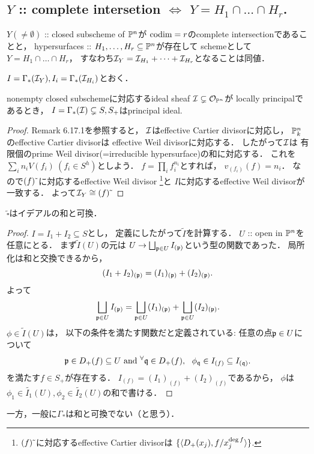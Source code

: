 \documentclass[a4paper]{jsarticle}
\begin{document}
    \subsection{$Y$ :: complete intersetion $\iff$ $Y=H_1\cap\dots\cap H_r$.}
    \begin{Claim}
        $Y (\neq \emptyset)$ :: closed subscheme of $\mathbb{P}^n$が
        $\operatorname{codim}=r$のcomplete intersectionであることと，
        hypersurfaces :: $H_1, \dots, H_r \subseteq \mathbb{P}^n$が存在して
        schemeとして$Y=H_1 \cap\dots\cap H_r$，
        すなわち$\mathcal{I}_Y=\mathcal{I}_{H_1}+\dots+\mathcal{I}_{H_r}$となることは同値．
    \end{Claim}
    $I=\Gamma_*(\mathcal{I}_Y), I_i=\Gamma_*(\mathcal{I}_{H_i})$とおく．

    \begin{Lemma}
        nonempty closed subschemeに対応するideal sheaf
        $\mathcal{I} \subsetneq \mathcal{O}_{\mathbb{P}^n}$が
        locally principalであるとき，
        $I=\Gamma_*(\mathcal{I}) \subsetneq S, S_+$はprincipal ideal.
    \end{Lemma}
    \begin{proof}
        Remark 6.17.1を参照すると，
        $\mathcal{I}$はeffective Cartier divisorに対応し，
        $\mathbb{P}^n_k$のeffective Cartier divisorは
        effective Weil divisorに対応する．
        したがって$\mathcal{I}$は
        有限個のprime Weil divisor(=irreducible hypersurface)の和に対応する．
        これを$\sum_i n_i V(f_i) \ (f_i \in S^h)$としよう．
        $f=\prod_i f_i^{n_i}$とすれば，
        $v_{(f_i)}(f)=n_i$．
        なので$(f)\,\tilde{}\,$に対応するeffective Weil divisor
        \footnote
        {
            $(f)\,\tilde{}\,$に対応するeffective Cartier divisorは
            $\{ \langle D_+(x_j),f / x_j^{\deg f} \rangle\}$.
        }と
        $I$に対応するeffective Weil divisorが一致する．
        よって$\mathcal{I}_Y \cong (f)\,\tilde{}\,$
    \end{proof}

    \begin{Lemma}
        $\tilde{\square}$はイデアルの和と可換．
    \end{Lemma}
    \begin{proof}
        $I=I_1+I_2 \subseteq S$とし，
        定義にしたがって$\tilde{I}$を計算する．
        $U$ :: open in $\mathbb{P}^n$を任意にとる．
        まず$\tilde{I}(U)$の元は
        $U \to \bigsqcup_{\mathfrak{p} \in U} I_{(\mathfrak{p})}$という型の関数であった．
        局所化は和と交換できるから，
        \[ (I_1+I_2)_{(\mathfrak{p})}=(I_1)_{(\mathfrak{p})}+(I_2)_{(\mathfrak{p})}. \]
        よって
        \[
            \bigsqcup_{\mathfrak{p} \in U} I_{(\mathfrak{p})}
            =
            \bigsqcup_{\mathfrak{p} \in U}(I_1)_{(\mathfrak{p})}
            +\bigsqcup_{\mathfrak{p} \in U}(I_2)_{(\mathfrak{p})}.
        \]
        $\phi \in \tilde{I}(U)$は，
        以下の条件を満たす関数だと定義されている:
        任意の点$\mathfrak{p} \in U$について
        \[
            \mathfrak{p} \in D_+(f) \subseteq U
            \text{ and }
            {}^{\forall} \mathfrak{q} \in D_+(f),~~
                \phi_{\mathfrak{q}} \in I_{(f)} \subseteq I_{(\mathfrak{q})}.
        \]
        を満たす$f \in S_+$が存在する．
        $I_{(f)}=(I_1)_{(f)}+(I_2)_{(f)}$であるから，
        $\phi$は
        $\phi_1 \in \tilde{I_1}(U), \phi_2 \in \tilde{I_2}(U)$の和で書ける．
    \end{proof}
    一方，一般に$\Gamma_*$は和と可換でない（と思う）．
\end{document}
